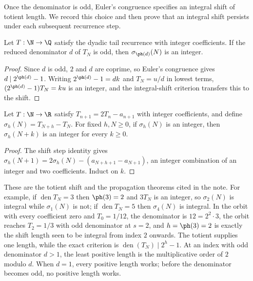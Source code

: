 Once the denominator is odd, Euler's congruence specifies an integral
shift of totient length.  We record this choice and then prove that
an integral shift persists under each subsequent recurrence step.

\begin{proposition}\label{long251:xr:totient}
Let $T:\N\to\Q$ satisfy the dyadic tail recurrence with integer coefficients.  If the
reduced denominator $d$ of $T_N$ is odd, then $\sigma_{\ph(d)}(N)$ is an
integer.
\end{proposition}

\begin{proof}
Since $d$ is odd, $2$ and $d$ are coprime, so Euler's congruence gives
$d\mid2^{\ph(d)}-1$.  Writing $2^{\ph(d)}-1=dk$ and $T_N=u/d$ in lowest terms,
$(2^{\ph(d)}-1)T_N=ku$ is an integer, and the integral-shift criterion
transfers this to the shift.
\end{proof}

\begin{proposition}[propagation]\label{long251:xr:propagate}
Let $T:\N\to\R$ satisfy $T_{n+1}=2T_n-a_{n+1}$ with integer coefficients,
and define $\sigma_h(N)=T_{N+h}-T_N$.  For fixed $h,N\ge0$,
if $\sigma_h(N)$ is an integer, then $\sigma_h(N+k)$ is an integer
for every $k\ge0$.
\end{proposition}

\begin{proof}
The shift step identity gives
$\sigma_h(N+1)=2\sigma_h(N)-(a_{N+h+1}-a_{N+1})$, an integer combination of an
integer and two coefficients.  Induct on $k$.
\end{proof}

\noindent These are the totient shift and the propagation theorems cited in the
note.  For example, if $\operatorname{den}T_N=3$ then $\ph(3)=2$ and
$3T_N$ is an integer, so $\sigma_2(N)$ is integral while $\sigma_1(N)$ is not;
if $\operatorname{den}T_N=5$ then $\sigma_4(N)$ is integral.  In the orbit with
every coefficient zero and $T_0=1/12$, the denominator is $12=2^2\cdot3$, the orbit
reaches $T_2=1/3$ with odd denominator at $s=2$, and $h=\ph(3)=2$ is exactly the
shift length seen to be integral from index $2$ onwards.  The totient supplies one length, while the exact criterion is
$\operatorname{den}(T_N)\mid2^{h}-1$.  At an index with odd denominator
$d>1$, the least positive length is the multiplicative order of $2$
modulo $d$.  When $d=1$, every positive length works; before the
denominator becomes odd, no positive length works.

